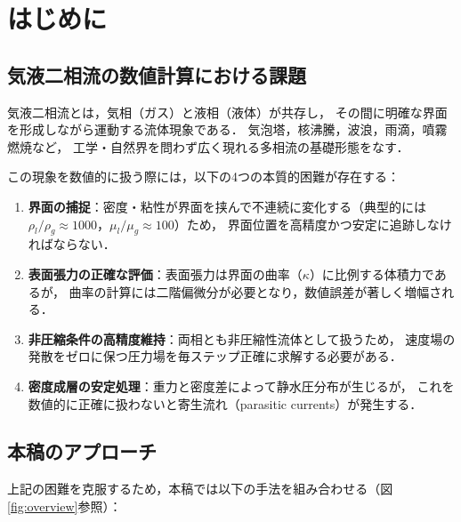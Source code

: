 \documentclass[12pt, a4paper, titlepage]{article}
\newcommand{\jp}[1]{{\normalfont\jpfont #1}}
\begin{document}
\tableofcontents
\newpage

\section{\jp{はじめに}}
\label{sec:intro}

\subsection{\jp{気液二相流の数値計算における課題}}

\jp{気液二相流とは，気相（ガス）と液相（液体）が共存し，
その間に明確な界面を形成しながら運動する流体現象である．
気泡塔，核沸騰，波浪，雨滴，噴霧燃焼など，
工学・自然界を問わず広く現れる多相流の基礎形態をなす．}

\jp{この現象を数値的に扱う際には，以下の4つの本質的困難が存在する：}

\begin{enumerate}
  \item \jp{\textbf{界面の捕捉}：密度・粘性が界面を挟んで不連続に変化する（典型的には
        $\rho_l/\rho_g \approx 1000$，$\mu_l/\mu_g \approx 100$）ため，
        界面位置を高精度かつ安定に追跡しなければならない．}
  \item \jp{\textbf{表面張力の正確な評価}：表面張力は界面の曲率（$\kappa$）に比例する体積力であるが，
        曲率の計算には二階偏微分が必要となり，数値誤差が著しく増幅される．}
  \item \jp{\textbf{非圧縮条件の高精度維持}：両相とも非圧縮性流体として扱うため，
        速度場の発散をゼロに保つ圧力場を毎ステップ正確に求解する必要がある．}
  \item \jp{\textbf{密度成層の安定処理}：重力と密度差によって静水圧分布が生じるが，
        これを数値的に正確に扱わないと寄生流れ（parasitic currents）が発生する．}
\end{enumerate}

\subsection{\jp{本稿のアプローチ}}

\jp{上記の困難を克服するため，本稿では以下の手法を組み合わせる（図\ref{fig:overview}参照）：}
\end{document}
